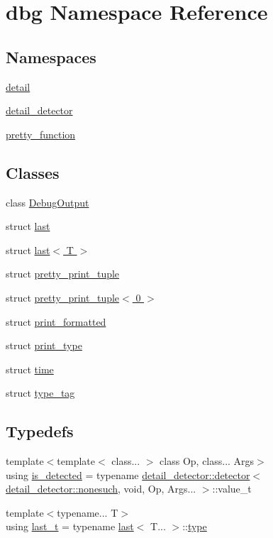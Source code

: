 \hypertarget{namespacedbg}{}\section{dbg Namespace Reference}
\label{namespacedbg}
\subsection*{Namespaces}
\begin{DoxyCompactItemize}
\item 
 \hyperlink{namespacedbg_1_1detail}{detail}
\item 
 \hyperlink{namespacedbg_1_1detail__detector}{detail\+\_\+detector}
\item 
 \hyperlink{namespacedbg_1_1pretty__function}{pretty\+\_\+function}
\end{DoxyCompactItemize}
\subsection*{Classes}
\begin{DoxyCompactItemize}
\item 
class \hyperlink{classdbg_1_1DebugOutput}{Debug\+Output}
\item 
struct \hyperlink{structdbg_1_1last}{last}
\item 
struct \hyperlink{structdbg_1_1last_3_01T_01_4}{last$<$ T $>$}
\item 
struct \hyperlink{structdbg_1_1pretty__print__tuple}{pretty\+\_\+print\+\_\+tuple}
\item 
struct \hyperlink{structdbg_1_1pretty__print__tuple_3_010_01_4}{pretty\+\_\+print\+\_\+tuple$<$ 0 $>$}
\item 
struct \hyperlink{structdbg_1_1print__formatted}{print\+\_\+formatted}
\item 
struct \hyperlink{structdbg_1_1print__type}{print\+\_\+type}
\item 
struct \hyperlink{structdbg_1_1time}{time}
\item 
struct \hyperlink{structdbg_1_1type__tag}{type\+\_\+tag}
\end{DoxyCompactItemize}
\subsection*{Typedefs}
\begin{DoxyCompactItemize}
\item 
{\footnotesize template$<$template$<$ class... $>$ class Op, class... Args$>$ }\\using \hyperlink{namespacedbg_a4fff29dc9282f3e887a7c1290477708c}{is\+\_\+detected} = typename \hyperlink{structdbg_1_1detail__detector_1_1detector}{detail\+\_\+detector\+::detector}$<$ \hyperlink{structdbg_1_1detail__detector_1_1nonesuch}{detail\+\_\+detector\+::nonesuch}, void, Op, Args... $>$\+::value\+\_\+t
\item 
{\footnotesize template$<$typename... T$>$ }\\using \hyperlink{namespacedbg_a4754c7365d6eb31696a4613230e21ac4}{last\+\_\+t} = typename \hyperlink{structdbg_1_1last}{last}$<$ T... $>$\+::\hyperlink{namespacedbg_a2365d80e3a3525e6025040383ff8661b}{type}
\end{DoxyCompactItemize}
